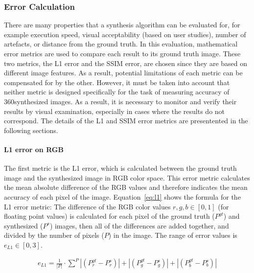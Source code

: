 \subsubsection{Error Calculation}
There are many properties that a synthesis algorithm can be evaluated for, for example execution speed, visual acceptability (based on user studies), number of artefacts, or distance from the ground truth. In this evaluation, mathematical
error metrics are used to compare each result to its ground truth image. These two metrics, the L1 error and the SSIM error, are chosen since they are based on different image features. As a result, potential limitations of each metric can be compensated for by the other. However, it must be taken into account that neither metric is designed specifically for the task of measuring accuracy of 360\degree synthesized images. As a result, it is necessary to monitor and verify their results by visual examination, especially in cases where the results do not correspond. The details of the L1 and SSIM error metrics are presentented in the following sections.

\paragraph{L1 error on RGB}
The first metric is the L1 error, which is calculated between the ground truth image and the synthesized image in RGB color space. This error metric calculates the mean absolute difference of the RGB values and therefore indicates the mean accuracy of each pixel of the image. 
Equation~\ref{eq:l1} shows the formula for the L1 error metric: The difference of the RGB color values $r,g,b \in [0,1]$ (for floating point values) is calculated for each pixel of the ground truth ($P^{gt}$) and synthesized ($P^{s}$) images, then all of the differences are added together, and divided by the number of pixels ($P$) in the image. The range of error values is $e_{L1} \in [0,3]$.

\begin{align}
  e_{L1} = \frac{1}{|P|} \cdot \sum_{}^{P} |(P_r^{gt} - P_r^{s})| + |(P_g^{gt} - P_g^{s})| + |(P_b^{gt} - P_b^{s})|   \label{eq:l1}
\end{align}


